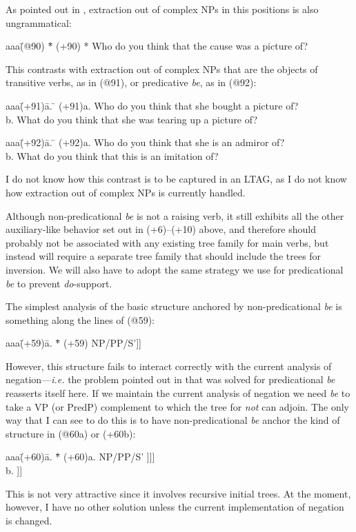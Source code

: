 As pointed out in \cite{mor90}, extraction out of complex NPs in this
positions is also ungrammatical:
\begin{tabbing}
aaa\=(@90) \= *\= \kill
   \>(+90) \> *\> Who do you think that the cause was a picture of?
\end{tabbing}
This contrasts with extraction out of complex NPs that are the objects
of transitive verbs, as in (@91), or predicative {\em be}, as in (@92):
\begin{tabbing}
aaa\=(+91)\=a. \= \kill
   \>(+91)\>a. \> Who do you think that she bought a picture of? \\
   \>     \>b. \> What do you think that she was tearing up a picture of?
\end{tabbing}
\begin{tabbing}
aaa\=(+92)\=a. \= \kill
   \>(+92)\>a. \> Who do you think that she is an admiror of? \\
   \>     \>b. \> What do you think that this is an imitation of?
\end{tabbing}
I do not know how this contrast is to be captured in an LTAG, as I do
not know how extraction out of complex NPs is currently handled.

Although non-predicational {\em be} is not a raising verb, it still
exhibits all the other auxiliary-like behavior set out in (+6)--(+10)
above, and therefore should probably not be associated with any existing
tree family for main verbs, but instead will require a separate tree
family that should include the trees for inversion.  We will also have
to adopt the same strategy we use for predicational {\em be} to prevent
{\em do}-support.

The simplest analysis of the basic structure anchored by
non-predicational {\em be} is something along the lines of (@59):
\begin{tabbing}
aaa\=(+59)\=a. \= *\= \kill
   \>(+59)\>   \>  \> [$_{S}$ NP [$_{VP}$ [$_{V}$ be] NP/PP/S']] 
\end{tabbing}
However, this structure fails to interact correctly with the current
analysis of negation---{\em i.e.\/} the problem pointed out in
\cite{za89} that was solved for predicational {\em be} reasserts itself
here.  If we maintain the current analysis of negation we need {\em be}
to take a VP (or PredP) complement to which the tree for {\em not} can
adjoin. The only way that I can see to do this is to have
non-predicational {\em be} anchor the kind of structure in (@60a) or
(+60b): 
\begin{tabbing}
aaa\=(+60)\=a. \= *\= \kill
   \>(+60)\>a. \>  \> [$_{S}$ NP [$_{VP}$ [$_{V}$ be] [$_{VP}$ [$_{V}$
                      0] NP/PP/S' ]]] \\
   \>     \>b. \>  \> [$_{S}$ NP [$_{VP}$ [$_{V}$ be] [$_{VP}$ 
                         NP/PP/S' ]]]
\end{tabbing}
This is not very attractive since it involves recursive
initial trees. At the moment, however, I have no other solution unless
the current implementation of negation is changed.

